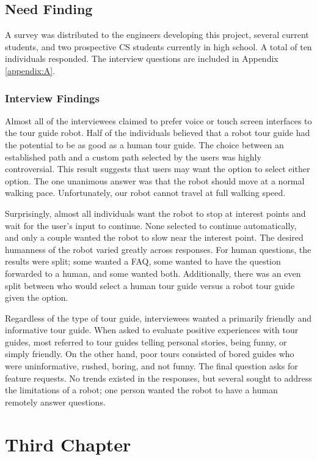 \documentclass[11pt]{report}
\begin{document}
\section{Need Finding}
A survey was distributed to the engineers developing this project, several current students, and two prospective CS students currently in high school. A total of ten individuals responded. The interview questions are included in Appendix \ref{appendix:A}.
\subsection{Interview Findings}
Almost all of the interviewees claimed to prefer voice or touch screen interfaces to the tour guide robot. Half of the individuals believed that a robot tour guide had the potential to be as good as a human tour guide. The choice between an established path and a custom path selected by the users was highly controversial. This result suggests that users may want the option to select either option. The one unanimous answer was that the robot should move at a normal walking pace. Unfortunately, our robot cannot travel at full walking speed. 

Surprisingly, almost all individuals want the robot to stop at interest points and wait for the user’s input to continue. None selected to continue automatically, and only a couple wanted the robot to slow near the interest point. The desired humanness of the robot varied greatly across responses. For human questions, the results were split; some wanted a FAQ, some wanted to have the question forwarded to a human, and some wanted both. Additionally, there was an even split between who would select a human tour guide versus a robot tour guide given the option. 

Regardless of the type of tour guide, interviewees wanted a primarily friendly and informative tour guide. When asked to evaluate positive experiences with tour guides, most referred to tour guides telling personal stories, being funny, or simply friendly. On the other hand, poor tours consisted of bored guides who were uninformative, rushed, boring, and not funny. The final question asks for feature requests. No trends existed in the responses, but several sought to address the limitations of a robot; one person wanted the robot to have a human remotely answer questions.

\chapter{Third Chapter}
\end{document}
